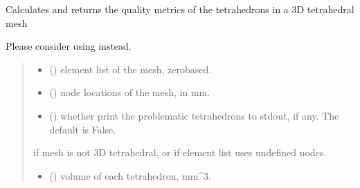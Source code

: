 \documentclass[letterpaper,10pt,english]{sphinxmanual}
\begin{document}
\begin{fulllineitems}
\label{\detokenize{_autosummary/nirfasterff.meshing.meshutils.checkmesh3d_solid:nirfasterff.meshing.meshutils.checkmesh3d_solid}}
\pysigstartsignatures
\pysiglinewithargsret
{}
{\sphinxparamcomma {}\sphinxparamcomma {}}
{}
\pysigstopsignatures
\sphinxAtStartPar
Calculates and returns the quality metrics of the tetrahedrons in a 3D tetrahedral mesh

\sphinxAtStartPar
Please consider using  instead.
\begin{quote}\begin{description}
\begin{itemize}
\item {} 
\sphinxAtStartPar
{} () \textendash{} element list of the mesh, zero\sphinxhyphen{}based.

\item {} 
\sphinxAtStartPar
{} () \textendash{} node locations of the mesh, in mm.

\item {} 
\sphinxAtStartPar
{} (\sphinxstyleliteralemphasis{\sphinxupquote{, }}) \textendash{} whether print the problematic tetrahedrons to stdout, if any. The default is False.

\end{itemize}

\sphinxAtStartPar
{} \textendash{} if mesh is not 3D tetrahedral, or if element list uses undefined nodes.

\sphinxAtStartPar
\begin{itemize}
\item {} 
\sphinxAtStartPar
{} () \textendash{} volume of each tetrahedron, mm\textasciicircum{}3.


\end{itemize}
\end{description}
\end{quote}
\end{fulllineitems}
\end{document}
